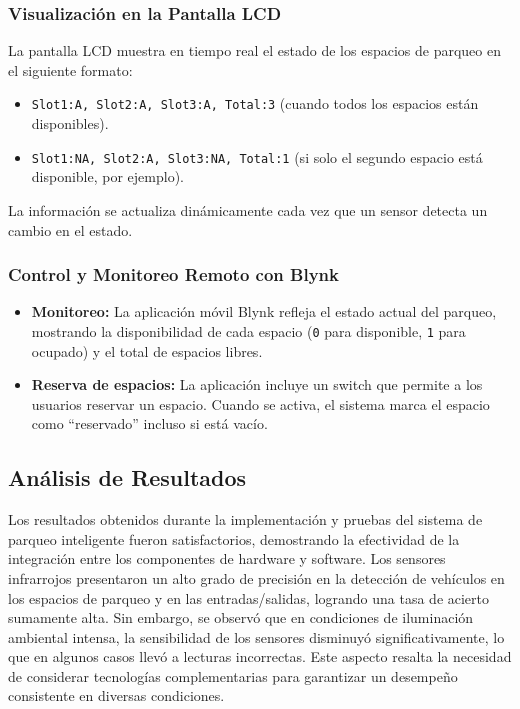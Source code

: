 \documentclass[12pt,a4paper]{article}
\begin{document}
\subsubsection{Visualización en la Pantalla LCD}
La pantalla LCD muestra en tiempo real el estado de los espacios de parqueo en el siguiente formato:
\begin{itemize}
    \item \texttt{Slot1:A, Slot2:A, Slot3:A, Total:3} (cuando todos los espacios están disponibles).
    \item \texttt{Slot1:NA, Slot2:A, Slot3:NA, Total:1} (si solo el segundo espacio está disponible, por ejemplo).
\end{itemize}
La información se actualiza dinámicamente cada vez que un sensor detecta un cambio en el estado.

\subsubsection{Control y Monitoreo Remoto con Blynk}
\begin{itemize}
    \item \textbf{Monitoreo:}  
    La aplicación móvil Blynk refleja el estado actual del parqueo, mostrando la disponibilidad de cada espacio (\texttt{0} para disponible, \texttt{1} para ocupado) y el total de espacios libres.

    \item \textbf{Reserva de espacios:}  
    La aplicación incluye un switch que permite a los usuarios reservar un espacio. Cuando se activa, el sistema marca el espacio como ``reservado'' incluso si está vacío.
\end{itemize}

\subsection{Análisis de Resultados}
Los resultados obtenidos durante la implementación y pruebas del sistema de parqueo inteligente fueron satisfactorios, demostrando la efectividad de la integración entre los componentes de hardware y software. Los sensores infrarrojos presentaron un alto grado de precisión en la detección de vehículos en los espacios de parqueo y en las entradas/salidas, logrando una tasa de acierto sumamente alta. Sin embargo, se observó que en condiciones de iluminación ambiental intensa, la sensibilidad de los sensores disminuyó significativamente, lo que en algunos casos llevó a lecturas incorrectas. Este aspecto resalta la necesidad de considerar tecnologías complementarias para garantizar un desempeño consistente en diversas condiciones.
\end{document}
